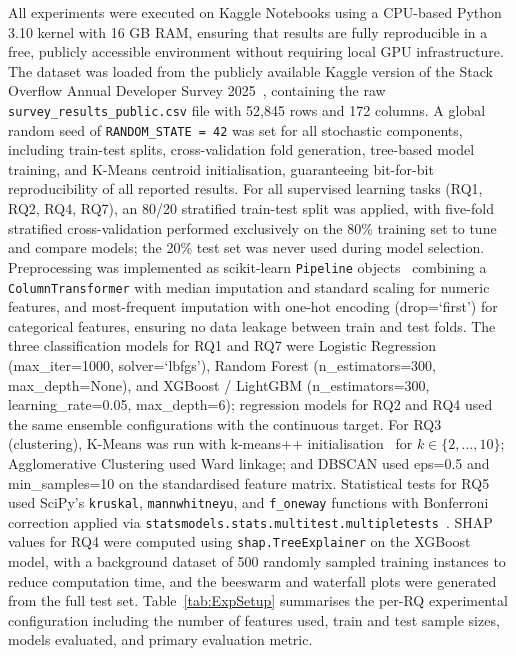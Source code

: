 \documentclass[journal, onecolumn]{IEEEtran}
\begin{document}
All experiments were executed on Kaggle Notebooks using a CPU-based Python 3.10 kernel with 16 GB RAM, ensuring that results are fully reproducible in a free, publicly accessible environment without requiring local GPU infrastructure.
The dataset was loaded from the publicly available Kaggle version of the Stack Overflow Annual Developer Survey 2025~\cite{stackoverflow2025survey}, containing the raw \texttt{survey\_results\_public.csv} file with 52,845 rows and 172 columns.
A global random seed of \texttt{RANDOM\_STATE = 42} was set for all stochastic components, including train-test splits, cross-validation fold generation, tree-based model training, and K-Means centroid initialisation, guaranteeing bit-for-bit reproducibility of all reported results.
For all supervised learning tasks (RQ1, RQ2, RQ4, RQ7), an 80/20 stratified train-test split was applied, with five-fold stratified cross-validation performed exclusively on the 80\% training set to tune and compare models; the 20\% test set was never used during model selection.
Preprocessing was implemented as scikit-learn \texttt{Pipeline} objects~\cite{pedregosa2011scikit} combining a \texttt{ColumnTransformer} with median imputation and standard scaling for numeric features, and most-frequent imputation with one-hot encoding (drop=`first') for categorical features, ensuring no data leakage between train and test folds.
The three classification models for RQ1 and RQ7 were Logistic Regression (max\_iter=1000, solver=`lbfgs'), Random Forest (n\_estimators=300, max\_depth=None), and XGBoost / LightGBM (n\_estimators=300, learning\_rate=0.05, max\_depth=6); regression models for RQ2 and RQ4 used the same ensemble configurations with the continuous target.
For RQ3 (clustering), K-Means was run with k-means++ initialisation~\cite{arthur2007k} for $k \in \{2, \ldots, 10\}$; Agglomerative Clustering used Ward linkage; and DBSCAN used eps=0.5 and min\_samples=10 on the standardised feature matrix.
Statistical tests for RQ5 used SciPy's \texttt{kruskal}, \texttt{mannwhitneyu}, and \texttt{f\_oneway} functions with Bonferroni correction applied via \texttt{statsmodels.stats.multitest.multipletests}~\cite{kruskal1952use}.
SHAP values for RQ4 were computed using \texttt{shap.TreeExplainer} on the XGBoost model, with a background dataset of 500 randomly sampled training instances to reduce computation time, and the beeswarm and waterfall plots were generated from the full test set.
Table~\ref{tab:ExpSetup} summarises the per-RQ experimental configuration including the number of features used, train and test sample sizes, models evaluated, and primary evaluation metric.
\end{document}
